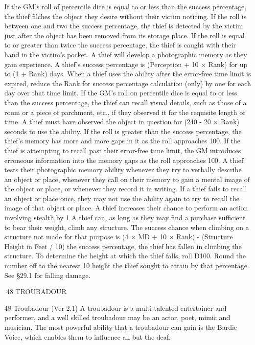 \documentclass[a4paper]{article}
\begin{document}
\begin{multicols}{3}
If the GM’s roll of percentile dice is equal to or
less than the success percentage, the thief filches
the object they desire without their victim noticing.
If the roll is between one and two the success percentage, the thief is detected by the victim just after
the object has been removed from its storage place.
If the roll is equal to or greater than twice the success percentage, the thief is caught with their hand
in the victim’s pocket.
A thief will develop a photographic memory as
they gain experience.
A thief’s success percentage is (Perception + 10 ×
Rank)%
for up to (1 + Rank) days. When a thief uses the
ability after the error-free time limit is expired,
reduce the Rank for success percentage calculation
(only) by one for each day over that time limit.
If the GM’s roll on percentile dice is equal to or
less than the success percentage, the thief can
recall visual details, such as those of a room or a
piece of parchment, etc., if they observed it for the
requisite length of time. A thief must have observed the object in question for (240 - 20 × Rank)
seconds to use the ability. If the roll is greater than
the success percentage, the thief’s memory has
more and more gaps in it as the roll approaches
100. If the thief is attempting to recall past their
error-free time limit, the GM introduces erroneous
information into the memory gaps as the roll approaches 100.
A thief tests their photographic memory ability
whenever they try to verbally describe an object or
place, whenever they call on their memory to gain
a mental image of the object or place, or whenever
they record it in writing. If a thief fails to recall an
object or place once, they may not use the ability
again to try to recall the image of that object or
place.
A thief increases their chance to perform an
action involving stealth by 1%
A thief can, as long as they may find a purchase
sufficient to bear their weight, climb any structure.
The success chance when climbing on a structure
not made for that purpose is (4 × MD + 10 × Rank)
- (Structure Height in Feet / 10)%
the success percentage, the thief has fallen in
climbing the structure. To determine the height at
which the thief falls, roll D100. Round the number
off to the nearest
10%
height the thief sought to attain by that percentage.
See §29.1 for falling damage.

48 TROUBADOUR

48 Troubadour (Ver 2.1)
A troubadour is a multi-talented entertainer and
performer, and a well skilled troubadour may be an
actor, poet, mimic and musician. The most powerful ability that a troubadour can gain is the Bardic
Voice, which enables them to influence all but the
deaf.


\end{multicols}
\end{document}
